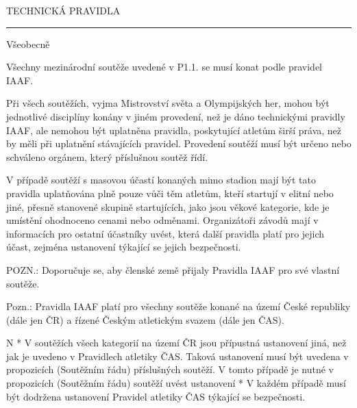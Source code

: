 \chap TECHNICKÁ PRAVIDLA

\rule{99}
\secc Všeobecně

Všechny mezinárodní soutěže uvedené v P1.1. se musí konat podle pravidel IAAF.

Při všech soutěžích, vyjma Mistrovství světa a Olympijských her, mohou být jednotlivé disciplíny konány v jiném provedení, než je dáno technickými pravidly IAAF, ale nemohou být uplatněna pravidla, poskytující atletům širší práva, než by měli při uplatnění stávajících pravidel.
Provedení soutěží musí být určeno nebo schváleno orgánem, který příslušnou soutěž řídí.

V případě soutěží s masovou účastí konaných mimo stadion mají být tato pravidla uplatňována plně pouze vůči těm atletům, kteří startují v elitní nebo jiné, přesně stanovené skupině startujících, jako jsou věkové kategorie, kde je umístění ohodnoceno cenami nebo odměnami.
Organizátoři závodů mají v informacích pro ostatní účastníky uvést, která další pravidla platí pro jejich účast, zejména ustanovení týkající se jejich bezpečnosti.

POZN.: Doporučuje se, aby členské země přijaly Pravidla IAAF pro své vlastní soutěže.

Pozn.: Pravidla IAAF platí pro všechny soutěže konané na území České republiky (dále jen ČR) a řízené Českým atletickým svazem (dále jen ČAS).

\begitems \style N 
* V soutěžích všech kategorií na území ČR jsou přípustná ustanovení jiná, než jak je uvedeno v Pravidlech atletiky ČAS. Taková ustanovení musí být uvedena v propozicích (Soutěžním řádu) příslušných soutěží. V tomto případě je nutné v propozicích (Soutěžním řádu) soutěží uvést ustanovení 
* V každém případě musí být dodržena ustanovení Pravidel atletiky ČAS týkající se bezpečnosti.
\enditems





















\endinput
